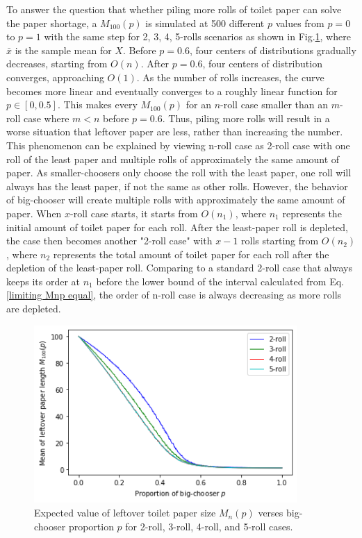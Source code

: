 \documentclass{article}
\begin{document}
To answer the question that whether piling more rolls of toilet paper can solve the paper shortage, a $M_{100}(p)$ is simulated at 500 different $p$ values from $p=0$ to $p=1$ with the same step for 2, 3, 4, 5-rolls scenarios as shown in Fig.\ref{Mnp-compare}, where $\bar{x}$ is the sample mean for $X$. Before $p=0.6$, four centers of distributions gradually decreases, starting from $O(n)$. After $p=0.6$, four centers of distribution converges, approaching $O(1)$. As the number of rolls increases, the curve becomes more linear and eventually converges to a roughly linear function for $p \in [0 ,0.5]$. This makes every $M_{100}(p)$ for an $n$-roll case smaller than an $m$-roll case where $m<n$ before $p=0.6$. Thus, piling more rolls will result in a worse situation that leftover paper are less, rather than increasing the number. This phenomenon can be explained by viewing n-roll case as 2-roll case with one roll of the least paper and multiple rolls of approximately the same amount of paper. As smaller-choosers only choose the roll with the least paper, one roll will always has the least paper, if not the same as other rolls. However, the behavior of big-chooser will create multiple rolls with approximately the same amount of paper. When $x$-roll case starts, it starts from $O(n_1)$, where $n_1$ represents the initial amount of toilet paper for each roll. After the least-paper roll is depleted, the case then becomes another "2-roll case" with $x-1$ rolls starting from $O(n_2)$, where $n_2$ represents the total amount of toilet paper for each roll after the depletion of the least-paper roll. Comparing to a standard 2-roll case that always keeps its order at $n_1$ before the lower bound of the interval calculated from Eq.\eqref{limiting Mnp equal}, the order of n-roll case is always decreasing as more rolls are depleted.
\begin{figure}[hb!]
    \centering
    \includegraphics[width=10cm]{2345roll-comparison.png}
    \caption{Expected value of leftover toilet paper size $M_n(p)$ verses big-chooser proportion $p$ for 2-roll, 3-roll, 4-roll, and 5-roll cases.}
    \label{Mnp-compare}
\end{figure}
\end{document}
